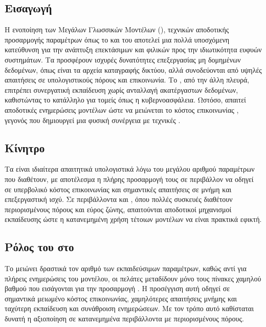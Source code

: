 \subsection{Εισαγωγή}

Η ενοποίηση των Μεγάλων Γλωσσικών Μοντέλων (), τεχνικών αποδοτικής προσαρμογής παραμέτρων όπως το  και του  αποτελεί μια πολλά υποσχόμενη κατεύθυνση για την ανάπτυξη επεκτάσιμων και φιλικών προς την ιδιωτικότητα ευφυών συστημάτων. Τα  προσφέρουν ισχυρές δυνατότητες επεξεργασίας μη δομημένων δεδομένων, όπως είναι τα αρχεία καταγραφής δικτύου, αλλά συνοδεύονται από υψηλές απαιτήσεις σε υπολογιστικούς πόρους και επικοινωνία. Το , από την άλλη πλευρά, επιτρέπει συνεργατική εκπαίδευση χωρίς ανταλλαγή ακατέργαστων δεδομένων, καθιστώντας το κατάλληλο για τομείς όπως η κυβερνοασφάλεια. Ωστόσο, απαιτεί αποδοτικές ενημερώσεις μοντέλων ώστε να μειώνεται το κόστος επικοινωνίας \cite{mcmahan2017communication}, γεγονός που δημιουργεί μια φυσική συνέργεια με τεχνικές .

\subsection{Κίνητρο}

Τα  είναι ιδιαίτερα απαιτητικά υπολογιστικά λόγω του μεγάλου αριθμού παραμέτρων που διαθέτουν, με αποτέλεσμα η πλήρης προσαρμογή τους σε περιβάλλον  να οδηγεί σε υπερβολικό κόστος επικοινωνίας και σημαντικές απαιτήσεις σε μνήμη και επεξεργαστική ισχύ. Σε περιβάλλοντα  και , όπου πολλές συσκευές διαθέτουν περιορισμένους πόρους και εύρος ζώνης, απαιτούνται αποδοτικοί μηχανισμοί εκπαίδευσης ώστε η κατανεμημένη χρήση τέτοιων μοντέλων να είναι πρακτικά εφικτή.

\subsection{Ρόλος του  στο }

Το  μειώνει δραστικά τον αριθμό των εκπαιδεύσιμων παραμέτρων, καθώς αντί για πλήρεις ενημερώσεις του μοντέλου, οι πελάτες μεταδίδουν μόνο τους πίνακες χαμηλού βαθμού που εισάγονται για την προσαρμογή \cite{hu2021lora}. Η προσέγγιση αυτή οδηγεί σε σημαντικά μειωμένο κόστος επικοινωνίας, χαμηλότερες απαιτήσεις μνήμης και ταχύτερη εκπαίδευση και συνάθροιση ενημερώσεων. Με τον τρόπο αυτό καθίσταται δυνατή η αξιοποίηση  σε κατανεμημένα περιβάλλοντα με περιορισμένους πόρους.

